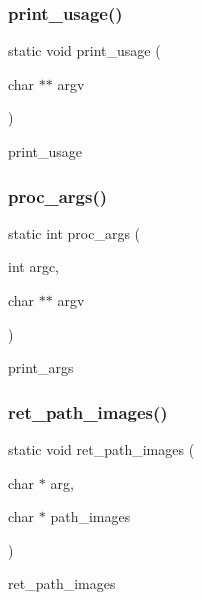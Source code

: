 \subsubsection{\texorpdfstring{print\+\_\+usage()}{print\_usage()}}
{\footnotesize\ttfamily static void print\+\_\+usage (\begin{DoxyParamCaption}\item[{char $\ast$$\ast$}]{argv }\end{DoxyParamCaption})\hspace{0.3cm}{\ttfamily [static]}}



print\+\_\+usage 

\hypertarget{group__proj_ga97b25d50dc55b5c8c2315fd010bc2957}{}\label{group__proj_ga97b25d50dc55b5c8c2315fd010bc2957} 
\subsubsection{\texorpdfstring{proc\+\_\+args()}{proc\_args()}}
{\footnotesize\ttfamily static int proc\+\_\+args (\begin{DoxyParamCaption}\item[{int}]{argc,  }\item[{char $\ast$$\ast$}]{argv }\end{DoxyParamCaption})\hspace{0.3cm}{\ttfamily [static]}}



print\+\_\+args 

\hypertarget{group__proj_ga3310cf47c29dd0f685c58e04fac7be4a}{}\label{group__proj_ga3310cf47c29dd0f685c58e04fac7be4a} 
\subsubsection{\texorpdfstring{ret\+\_\+path\+\_\+images()}{ret\_path\_images()}}
{\footnotesize\ttfamily static void ret\+\_\+path\+\_\+images (\begin{DoxyParamCaption}\item[{char $\ast$}]{arg,  }\item[{char $\ast$}]{path\+\_\+images }\end{DoxyParamCaption})\hspace{0.3cm}{\ttfamily [static]}}



ret\+\_\+path\+\_\+images 

